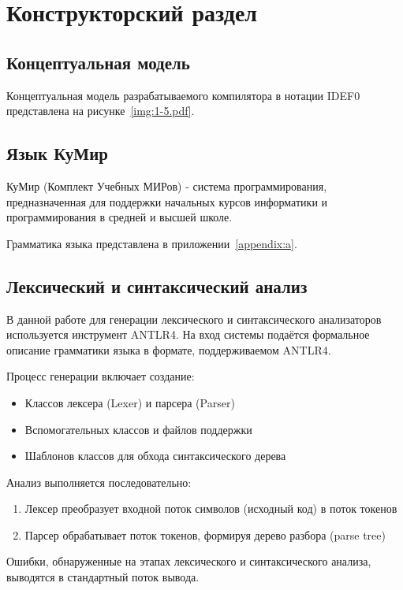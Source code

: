 \section{Конструкторский раздел}

\subsection{Концептуальная модель}

Концептуальная модель разрабатываемого компилятора в нотации IDEF0 представлена на рисунке~\ref{img:1-5.pdf}.


\subsection{Язык КуМир}

КуМир (Комплект Учебных МИРов) - система программирования, предназначенная для поддержки начальных курсов информатики и программирования в средней и высшей школе.


Грамматика языка представлена в приложении~\ref{appendix:a}.

\subsection{Лексический и синтаксический анализ}
В данной работе для генерации лексического и синтаксического анализаторов используется инструмент \textsc{ANTLR4}. На вход системы подаётся формальное описание грамматики языка в формате, поддерживаемом \textsc{ANTLR4}.

Процесс генерации включает создание:
\begin{itemize}
    \item Классов лексера (Lexer) и парсера (Parser)
    \item Вспомогательных классов и файлов поддержки
    \item Шаблонов классов для обхода синтаксического дерева
\end{itemize}

Анализ выполняется последовательно:
\begin{enumerate}
    \item Лексер преобразует входной поток символов (исходный код) в поток токенов
    \item Парсер обрабатывает поток токенов, формируя дерево разбора (parse tree)
\end{enumerate}
Ошибки, обнаруженные на этапах лексического и синтаксического анализа, выводятся в стандартный поток вывода.

